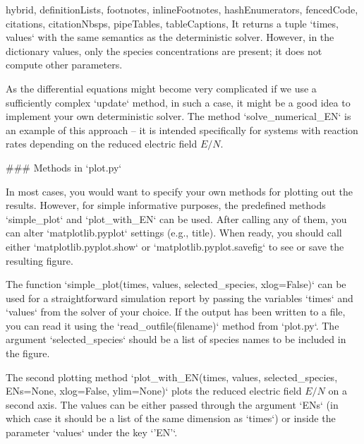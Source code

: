 \begin{markdown*}{%
  hybrid,
  definitionLists,
  footnotes,
  inlineFootnotes,
  hashEnumerators,
  fencedCode,
  citations,
  citationNbsps,
  pipeTables,
  tableCaptions,
}
It returns a tuple `times, values` with the same semantics as the deterministic solver. However, in the dictionary values, only the species concentrations are present; it does not compute other parameters.

As the differential equations might become very complicated if we use a sufficiently complex `update` method, in such a case, it might be a good idea to implement your own deterministic solver. The method `solve_numerical_EN` is an example of this approach -- it is intended specifically for systems with reaction rates depending on the reduced electric field $E/N$.


### Methods in `plot.py`

In most cases, you would want to specify your own methods for plotting out the results. However, for simple informative purposes, the predefined methods `simple_plot` and `plot_with_EN` can be used. After calling any of them, you can alter `matplotlib.pyplot` settings (e.g., title). When ready, you should call either `matplotlib.pyplot.show` or `matplotlib.pyplot.savefig` to see or save the resulting figure.


The function `simple_plot(times, values, selected_species, xlog=False)` can be used for a straightforward simulation report by passing the variables `times` and `values` from the solver of your choice. If the output has been written to a file, you can read it using the `read_outfile(filename)` method from `plot.py`. The argument `selected_species` should be a list of species names to be included in the figure.

The second plotting method `plot_with_EN(times, values, selected_species, ENs=None, xlog=False, ylim=None)` plots the reduced electric field $E/N$ on a second axis. The values can be either passed through the argument `ENs` (in which case it should be a list of the same dimension as `times`) or inside the parameter `values` under the key `'EN'`.

\end{markdown*}
